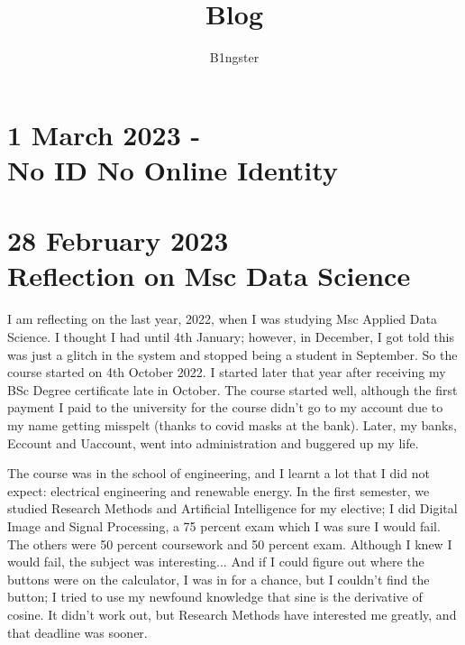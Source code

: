 \documentclass{article}
\title{Blog}
\author{B1ngster}
\date{}
\begin{document}
\maketitle
\newpage


\tableofcontents
\newpage

\section*{1 March 2023 - \\ No ID No Online Identity}
 
\section*{28 February 2023 \\ Reflection on Msc Data Science}


I am reflecting on the last year, 2022, when I was studying Msc Applied Data Science. I thought I had until 4th January; however, in December, I got told this was just a glitch in the system and stopped being a student in September. So the course started on 4th October 2022. I started later that year after receiving my BSc Degree certificate late in October. The course started well, although the first payment I paid to the university for the course didn't go to my account due to my name getting misspelt (thanks to covid masks at the bank). Later, my banks, Eccount and Uaccount, went into administration and buggered up my life.

The course was in the school of engineering, and I learnt a lot that I did not expect:  electrical engineering and renewable energy. In the first semester, we studied Research Methods and Artificial Intelligence for my elective; I did Digital Image and Signal Processing, a 75 percent exam which I was sure I would fail. The others were 50 percent coursework and 50 percent exam. Although I knew I would fail, the subject was interesting...  And if I could figure out where the buttons were on the calculator, I was in for a chance, but I couldn't find the button; I tried to use my newfound knowledge that sine is the derivative of cosine. It didn't work out, but Research Methods have interested me greatly, and that deadline was sooner.
 
\end{document}
